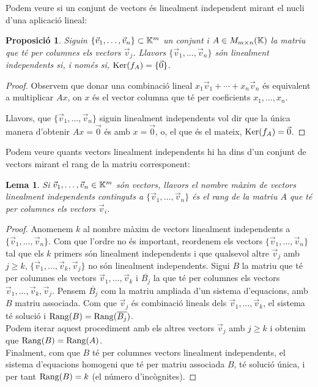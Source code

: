 \documentclass[
  11pt,
]{book}
\numberwithin{dummy}{section}
\theoremstyle{maincolornumbox}
\theoremstyle{blacknumex}
\theoremstyle{blacknumbox}
\theoremstyle{maincolornum}
\newtheorem{propositionT}{Proposició}[chapter]
\newtheorem{lemmaT}{Lema}[chapter]
\newenvironment{proposition}{\begin{pBox}\begin{propositionT}}{\end{propositionT}\end{pBox}}
\newenvironment{lemma}{\begin{pBox}\begin{lemmaT}}{\end{lemmaT}\end{pBox}}
\newlength\esp
\begin{document}
Podem veure si un conjunt de vectors és linealment independent mirant el
nucli d'una aplicació lineal:

\begin{proposition}
Siguin \(\{\vec v_1, \dots, \vec v_n\}\subset \mathbb{K}^m\) un conjunt i
\(A\in M_{m\times n}(\mathbb{K})\) la matriu que té per columnes els vectors
\(\vec v_j\). Llavors \(\{\vec v_1, \dots, \vec v_n\}\) són linealment
independents si, i només si, \(\operatorname{Ker}(f_A)=\{\vec 0\}\).
\end{proposition}

\begin{proof}
Observem que donar una combinació lineal
\(x_1\vec v_1+ \cdots+x_n \vec v_n\) és equivalent a multiplicar \(Ax\), on
\(x\) és el vector columna que té per coeficients \(x_1, \dots, x_n\).

Llavors, que \(\{\vec v_1, \dots, \vec v_n\}\) siguin linealment
independents vol dir que la única manera d'obtenir \(Ax=\vec 0\) és amb
\(x=\vec 0\), o, el que és el mateix, \(\operatorname{Ker}(f_A)=\vec 0\).
\end{proof}

Podem veure quants vectors linealment independents hi ha dins d'un
conjunt de vectors mirant el rang de la matriu corresponent:

\begin{lemma}
\protect\hypertarget{lem:rangiLI}{}\label{lem:rangiLI}Si
\(\vec v_1, \dots ,\vec v_n\in\mathbb{K}^m\) són vectors, llavors el nombre màxim
de vectors linealment independents continguts a
\(\{\vec v_1, \dots ,\vec v_n\}\) és el rang de la matriu \(A\) que té per
columnes els vectors \(\vec v_i\).
\end{lemma}

\begin{proof}
Anomenem \(k\) al nombre màxim de vectors linealment independents
a \(\{\vec v_1, \dots ,\vec v_n\}\). Com que l'ordre no és important,
reordenem els vectors \(\{\vec v_1, \dots ,\vec v_n\}\) tal que els \(k\)
primers són linealment independents i que qualsevol altre \(\vec v_j\) amb
\(j\geq k\), \(\{\vec v_1, \dots ,\vec v_k,\vec v_j\}\) no són linealment
independents. Sigui \(B\) la matriu que té per columnes els vectors
\(\vec v_1, \dots, \vec v_k\) i \(\overline{B_j}\) la que té per columnes
els vectors \(\vec v_1, \dots, \vec v_k,\vec v_j\). Pensem
\(\overline{B_j}\) com la matriu ampliada d'un sistema d'equacions, amb
\(B\) matriu associada. Com que \(\vec v_j\) és combinació lineals dels
\(\vec v_1, \dots, \vec v_k\), el sistema té solució i
\(\operatorname{Rang}(B)=\operatorname{Rang}(\overline{B_j})\).\\
Podem iterar aquest procediment amb els altres vectors \(\vec v_{j}\) amb
\(j\geq k\) i obtenim que \(\operatorname{Rang}(B)=\operatorname{Rang}(A)\).\\
Finalment, com que \(B\) té per columnes vectors linealment independents,
el sistema d'equacions homogeni que té per matriu associada \(B\), té
solució única, i per tant \(\operatorname{Rang}(B)=k\) (el número d'incògnites).
\end{proof}
\end{document}
